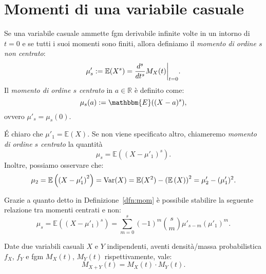 \section{Momenti di una variabile casuale}

\begin{dfn}\label{dfn:mom}
Se una variabile casuale ammette fgm derivabile infinite volte in un intorno di \(t=0\) e se tutti i suoi momenti sono finiti, allora definiamo il \emph{momento di ordine \(s\) non centrato}: 
\begin{equation}
  \mu'_s := \mathbb{E}(X^s) = \restr{\frac{d^s}{dt^s} M_X(t)}{t=0}.
\end{equation} 
Il \emph{momento di ordine \(s\) centrato} in \(a \in \mathbb{R}\) è definito come: 
\begin{equation}
  \mu_s (a) := \mathbbm{E} ((X-a)^s),
\end{equation}
ovvero $\mu'_s = \mu_s (0)$.
\end{dfn}

\begin{oss}
  \'E chiaro che \(\mu'_1 = \mathbb{E}(X)\). Se non viene specificato altro, chiameremo \emph{momento di ordine \(s\) centrato} la quantità
  \begin{equation}
    \mu_s = \mathbb{E}((X-\mu'_1)^s).
  \end{equation}
  Inoltre, possiamo osservare che:
  \begin{equation*}
    \mu_2 = \mathbb{E} \left({\left(X-\mu'_1\right)}^2\right) 
          = \operatorname{Var}(X) 
          = \mathbb{E} (X^2) - \left(\mathbb{E} \left(X\right)\right)^2
          = \mu'_2 - (\mu'_1)^2.
  \end{equation*}
\end{oss}
\begin{oss}
  Grazie a quanto detto in Definizione~\ref{dfn:mom} è possibile stabilire la seguente relazione tra momenti centrati e non:
  \begin{equation}
    \mu_s = \mathbb{E} \left({\left(X-\mu'_1\right)}^s\right) =
            \sum_{m=0}^s (-1)^m \binom{s}{m} \mu'_{s-m} (\mu'_1)^m.
  \end{equation}
\end{oss}

\begin{thm}
Date due variabili casuali \(X\) e \(Y\) indipendenti, aventi densità/massa probabilistica \(f_X\), \(f_Y\) e fgm \(M_X(t)\), \(M_Y(t)\) rispettivamente,
vale:
\begin{equation}
  M_{X+Y}(t) = M_X(t) \cdot M_Y(t).
\end{equation}
\end{thm}

